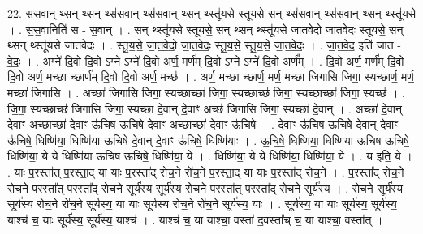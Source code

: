 \documentclass[17pt]{extarticle}
\begin{document}
22. स॒स॒वान् थ्सन् थ्सन् थ्स॑स॒वान् थ्स॑स॒वान् थ्सन् थ्स्तू॑यसे स्तूयसे॒ सन् थ्स॑स॒वान् थ्स॑स॒वान् थ्सन् थ्स्तू॑यसे । . स॒स॒वानिति॑ स - स॒वान् । . सन् थ्स्तू॑यसे स्तूयसे॒ सन् थ्सन् थ्स्तू॑यसे जातवेदो जातवेदः स्तूयसे॒ सन् थ्सन् थ्स्तू॑यसे जातवेदः । . स्तू॒य॒से॒ जा॒त॒वे॒दो॒ जा॒त॒वे॒दः॒ स्तू॒य॒से॒ स्तू॒य॒से॒ जा॒त॒वे॒दः॒ । . जा॒त॒वे॒द॒ इति॑ जात - वे॒दः॒ । . अग्ने॑ दि॒वो दि॒वो ऽग्ने ऽग्ने॑ दि॒वो अर्ण॒ मर्ण॑म् दि॒वो ऽग्ने ऽग्ने॑ दि॒वो अर्ण᳚म् । . दि॒वो अर्ण॒ मर्ण॑म् दि॒वो दि॒वो अर्ण॒ मच्छा च्छार्ण॑म् दि॒वो दि॒वो अर्ण॒ मच्छ॑ । . अर्ण॒ मच्छा च्छार्ण॒ मर्ण॒ मच्छा॑ जिगासि जिगा॒ स्यच्छार्ण॒ मर्ण॒ मच्छा॑ जिगासि । . अच्छा॑ जिगासि जिगा॒ स्यच्छाच्छा॑ जिगा॒ स्यच्छाच्छ॑ जिगा॒ स्यच्छाच्छा॑ जिगा॒ स्यच्छ॑ । . जि॒गा॒ स्यच्छाच्छ॑ जिगासि जिगा॒ स्यच्छा॑ दे॒वान् दे॒वाꣳ अच्छ॑ जिगासि जिगा॒ स्यच्छा॑ दे॒वान् । . अच्छा॑ दे॒वान् दे॒वाꣳ अच्छाच्छा॑ दे॒वाꣳ ऊ॑चिष ऊचिषे दे॒वाꣳ अच्छाच्छा॑ दे॒वाꣳ ऊ॑चिषे । . दे॒वाꣳ ऊ॑चिष ऊचिषे दे॒वान् दे॒वाꣳ ऊ॑चिषे॒ धिष्णि॑या॒ धिष्णि॑या ऊचिषे दे॒वान् दे॒वाꣳ ऊ॑चिषे॒ धिष्णि॑याः । . ऊ॒चि॒षे॒ धिष्णि॑या॒ धिष्णि॑या ऊचिष ऊचिषे॒ धिष्णि॑या॒ ये ये धिष्णि॑या ऊचिष ऊचिषे॒ धिष्णि॑या॒ ये । . धिष्णि॑या॒ ये ये धिष्णि॑या॒ धिष्णि॑या॒ ये । . य इति॒ ये । . याः प॒रस्ता᳚त् प॒रस्ता॒द् या याः प॒रस्ता᳚द् रोच॒ने रो॑च॒ने प॒रस्ता॒द् या याः प॒रस्ता᳚द् रोच॒ने । . प॒रस्ता᳚द् रोच॒ने रो॑च॒ने प॒रस्ता᳚त् प॒रस्ता᳚द् रोच॒ने सूर्य॑स्य॒ सूर्य॑स्य रोच॒ने प॒रस्ता᳚त् प॒रस्ता᳚द् रोच॒ने सूर्य॑स्य । . रो॒च॒ने सूर्य॑स्य॒ सूर्य॑स्य रोच॒ने रो॑च॒ने सूर्य॑स्य॒ या याः सूर्य॑स्य रोच॒ने रो॑च॒ने सूर्य॑स्य॒ याः । . सूर्य॑स्य॒ या याः सूर्य॑स्य॒ सूर्य॑स्य॒ याश्च॑ च॒ याः सूर्य॑स्य॒ सूर्य॑स्य॒ याश्च॑ । . याश्च॑ च॒ या याश्चा॒ वस्ता॑ द॒वस्ता᳚च् च॒ या याश्चा॒ वस्ता᳚त् । \newline
\end{document}

